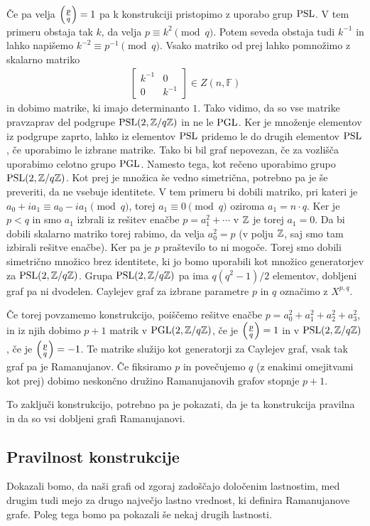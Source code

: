 Če pa velja \(\left(\frac{p}{q}\right) = 1\) pa k konstrukciji pristopimo z uporabo grup \(\operatorname{PSL}\). V tem primeru obstaja tak \(k\), da velja \(p\equiv k^2 \pmod q\). Potem seveda obstaja tudi \(k^{-1}\) in lahko napišemo \(k^{-2} \equiv p^{-1}\pmod q\). Vsako matriko od prej lahko pomnožimo z skalarno matriko
\begin{align*}
    \begin{bmatrix}
        k^{-1} & 0 \\
        0 & k^{-1}
    \end{bmatrix}\in Z(n, \mathbb F)
\end{align*}
in dobimo matrike, ki imajo determinanto \(1\). Tako vidimo, da so vse matrike pravzaprav del podgrupe \(\operatorname{PSL}(2, \mathbb Z/q\mathbb Z)\) in ne le \(\operatorname{PGL}\). Ker je množenje elementov iz podgrupe zaprto, lahko iz elementov \(\operatorname{PSL}\) pridemo le do drugih elementov \(\operatorname{PSL}\), če uporabimo le izbrane matrike. Tako bi bil graf nepovezan, če za vozlišča uporabimo celotno grupo \(\operatorname{PGL}\). Namesto tega, kot rečeno uporabimo grupo \(\operatorname{PSL}(2, \mathbb Z/q\mathbb Z)\). Kot prej je množica še vedno simetrična, potrebno pa je še preveriti, da ne vsebuje identitete. V tem primeru bi dobili matriko, pri kateri je \(a_0 +ia_1 \equiv a_0 - ia_1 \pmod q\), torej \(a_1 \equiv 0 \pmod q\) oziroma \(a_1 = n\cdot q\). Ker je \(p<q\) in smo \(a_1\) izbrali iz rešitev enačbe \(p=a_1^2 + \cdots\) v \(\mathbb Z\) je torej \(a_1=0\). Da bi dobili skalarno matriko torej rabimo, da velja \(a_0^2 = p\) (v polju \(\mathbb Z\), saj smo tam izbirali rešitve enačbe). Ker pa je \(p\) praštevilo to ni mogoče. Torej smo dobili simetrično množico brez identitete, ki jo bomo uporabili kot množico generatorjev za \(\operatorname{PSL}(2, \mathbb Z/q\mathbb Z)\). Grupa \(\operatorname{PSL}(2, \mathbb Z/q\mathbb Z)\) pa ima \(q(q^2-1)/2\) elementov, dobljeni graf pa ni dvodelen. Caylejev graf za izbrane parametre \(p\) in \(q\) označimo z \(X^{p,q}\).

Če torej povzamemo konstrukcijo, poiščemo rešitve enačbe \(p = a_0^2 + a_1^2 + a_2^2 + a_3^2\), in iz njih dobimo \(p+1\) matrik v \(\operatorname{PGL}(2, \mathbb Z/q\mathbb Z)\), če je \(\left(\frac{p}{q}\right)=1\) in v \(\operatorname{PSL}(2, \mathbb Z/q\mathbb Z)\), če je \(\left(\frac{p}{q}\right)=-1\). Te matrike služijo kot generatorji za Caylejev graf, vsak tak graf pa je Ramanujanov. Če fiksiramo \(p\) in povečujemo \(q\) (z enakimi omejitvami kot prej) dobimo neskončno družino Ramanujanovih grafov stopnje \(p+1\).

To zaključi konstrukcijo, potrebno pa je pokazati, da je ta konstrukcija pravilna in da so vsi dobljeni grafi Ramanujanovi.

\subsection{Pravilnost konstrukcije}
Dokazali bomo, da naši grafi od zgoraj zadoščajo določenim lastnostim, med drugim tudi mejo za drugo največjo lastno vrednost, ki definira Ramanujanove grafe. Poleg tega bomo pa pokazali še nekaj drugih lastnosti.

